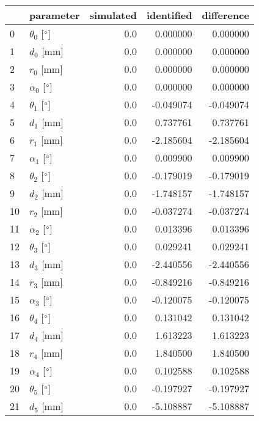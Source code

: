 \documentclass{standalone}%
\begin{document}
%
\normalsize%
\begin{tabular}{llrrr}
\toprule
{} &                 parameter & simulated & identified & difference \\
\midrule
0  &  $\theta_{0}$ [$\degree$] &       0.0 &   0.000000 &   0.000000 \\
1  &              $d_{0}$ [mm] &       0.0 &   0.000000 &   0.000000 \\
2  &              $r_{0}$ [mm] &       0.0 &   0.000000 &   0.000000 \\
3  &  $\alpha_{0}$ [$\degree$] &       0.0 &   0.000000 &   0.000000 \\
4  &  $\theta_{1}$ [$\degree$] &       0.0 &  -0.049074 &  -0.049074 \\
5  &              $d_{1}$ [mm] &       0.0 &   0.737761 &   0.737761 \\
6  &              $r_{1}$ [mm] &       0.0 &  -2.185604 &  -2.185604 \\
7  &  $\alpha_{1}$ [$\degree$] &       0.0 &   0.009900 &   0.009900 \\
8  &  $\theta_{2}$ [$\degree$] &       0.0 &  -0.179019 &  -0.179019 \\
9  &              $d_{2}$ [mm] &       0.0 &  -1.748157 &  -1.748157 \\
10 &              $r_{2}$ [mm] &       0.0 &  -0.037274 &  -0.037274 \\
11 &  $\alpha_{2}$ [$\degree$] &       0.0 &   0.013396 &   0.013396 \\
12 &  $\theta_{3}$ [$\degree$] &       0.0 &   0.029241 &   0.029241 \\
13 &              $d_{3}$ [mm] &       0.0 &  -2.440556 &  -2.440556 \\
14 &              $r_{3}$ [mm] &       0.0 &  -0.849216 &  -0.849216 \\
15 &  $\alpha_{3}$ [$\degree$] &       0.0 &  -0.120075 &  -0.120075 \\
16 &  $\theta_{4}$ [$\degree$] &       0.0 &   0.131042 &   0.131042 \\
17 &              $d_{4}$ [mm] &       0.0 &   1.613223 &   1.613223 \\
18 &              $r_{4}$ [mm] &       0.0 &   1.840500 &   1.840500 \\
19 &  $\alpha_{4}$ [$\degree$] &       0.0 &   0.102588 &   0.102588 \\
20 &  $\theta_{5}$ [$\degree$] &       0.0 &  -0.197927 &  -0.197927 \\
21 &              $d_{5}$ [mm] &       0.0 &  -5.108887 &  -5.108887 \\

\end{tabular}
\end{document}
